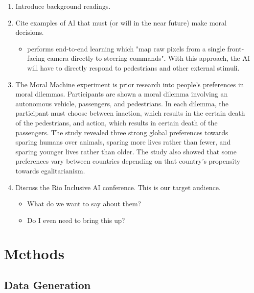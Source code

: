 \documentclass{report}
\begin{document}
\begin{enumerate}
    \item Introduce background readings.
    
    \item Cite examples of AI that must (or will in the near future) make moral decisions.
    \begin{itemize}
        \item \cite{bojarski2016end} performs end-to-end learning which "map raw pixels from a
        single front-facing camera directly to steering commands". With this approach, the AI will
        have to directly respond to pedestrians and other external stimuli.
    \end{itemize}
    
    \item The Moral Machine experiment \cite{awad2018moral} is prior research into people's
    preferences in moral dilemmas. Participants are shown a moral dilemma involving an autonomous
    vehicle, passengers, and pedestrians. In each dilemma, the participant must choose between
    inaction, which results in the certain death of the pedestrians, and action, which results in
    certain death of the passengers. The study revealed three strong global preferences towards
    sparing humans over animals, sparing more lives rather than fewer, and sparing younger lives
    rather than older. The study also showed that some preferences vary between countries depending
    on that country's propensity towards egalitarianism.
    
    \item Discuss the Rio Inclusive AI conference. This is our target audience.
    \begin{itemize}
        \item What do we want to say about them?
        \item Do I even need to bring this up?
    \end{itemize}
\end{enumerate}

\chapter{Methods}

\section{Data Generation}
\end{document}
